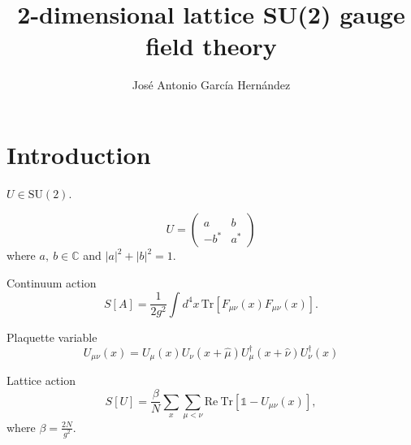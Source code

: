 \documentclass[12pt,a4paper]{article}
\author{José Antonio García Hernández}
\title{2-dimensional lattice SU(2) gauge field theory}
\begin{document}
\maketitle
\section{Introduction}
$U \in \text{SU}(2)$.

\begin{equation}
	U = \begin{pmatrix}
		a & b \\
		-b^* & a^*
	\end{pmatrix}
\end{equation}
where $a, \ b \in \mathbb{C}$ and $|a|^2 + |b|^2 = 1$.




Continuum action
\begin{equation}
	\label{eq:continuum_action}
	S[A] = \frac{1}{2g^2} \int d^4x \, \text{Tr} \left[ F_{\mu\nu}(x)F_{\mu\nu}(x)\right].
\end{equation} 

Plaquette variable
\begin{equation}
	U_{\mu\nu}(x) = U_{\mu}(x)U_{\nu}(x+\hat{\mu})U_{\mu}^{\dagger}(x+\hat{\nu})U_{\nu}^{\dagger}(x) 
\end{equation}


Lattice action
\begin{equation}
	\label{eq:wilson_action}
	S[U] = \frac{\beta}{N}\sum_x \sum_{\mu < \nu} \text{Re}\ \text{Tr} \left[\mathds{1} - U_{\mu\nu}(x) \right],
\end{equation}
where $\beta = \frac{2N}{g^2}$.
\end{document}
